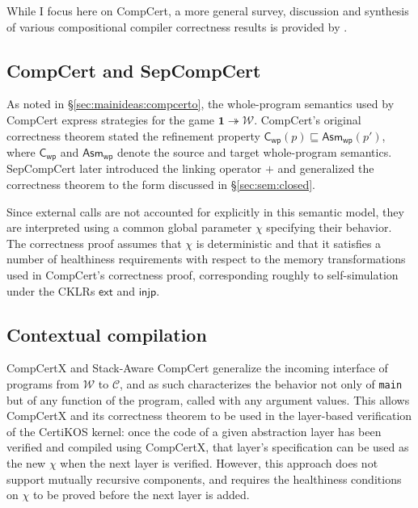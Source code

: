 \documentclass[11pt,oneside,draft]{book}
\theoremstyle{definition}
\newcommand{\kw}[1]{\ensuremath{ \mathsf{#1} }}
\newcommand{\refby}{\sqsubseteq} %
\begin{document}
While I focus here on CompCert,
a more general survey,
discussion and synthesis of various
compositional compiler correctness results
is provided by \citet{next700}.

\subsection{CompCert and SepCompCert} %

As noted in \S\ref{sec:mainideas:compcerto},
the whole-program semantics used by CompCert
express strategies for the game
$\mathbf{1} \twoheadrightarrow \mathcal{W}$.
CompCert's original correctness theorem
stated the refinement property
$\kw{C}_\kw{wp}(p) \refby \kw{Asm}_\kw{wp}(p')$,
where $\kw{C}_\kw{wp}$ and $\kw{Asm}_\kw{wp}$
denote the source and target whole-program semantics.
SepCompCert \citep{sepcompcert}
later introduced the linking operator $+$
and generalized the correctness theorem to
the form discussed in \S\ref{sec:sem:closed}.

Since external calls are not accounted for explicitly
in this semantic model,
they are interpreted %
using a common global parameter $\chi$
specifying their behavior.
The correctness proof assumes that $\chi$ is deterministic
and that it satisfies a number of healthiness requirements
with respect to the memory transformations
used in CompCert's correctness proof,
corresponding roughly to self-simulation
under the CKLRs $\kw{ext}$ and $\kw{injp}$.


\subsection{Contextual compilation} \label{sec:compcertx} %

CompCertX \citep{popl15} and
Stack-Aware CompCert \citep{stackaware}
generalize
the incoming interface of programs
from $\mathcal{W}$ to $\mathcal{C}$,
and as such characterizes the behavior
not only of \texttt{main}
but of any function of the program,
called with any argument values.
This allows CompCertX and its correctness theorem
to be used in the layer-based verification of
the CertiKOS kernel:
once the code of a given abstraction layer has been verified
and compiled using CompCertX,
that layer's specification can be used as the new $\chi$
when the next layer is verified.
However,
this approach does not support
mutually recursive components,
and requires the healthiness conditions on $\chi$
to be proved before the next layer is added.
\end{document}
